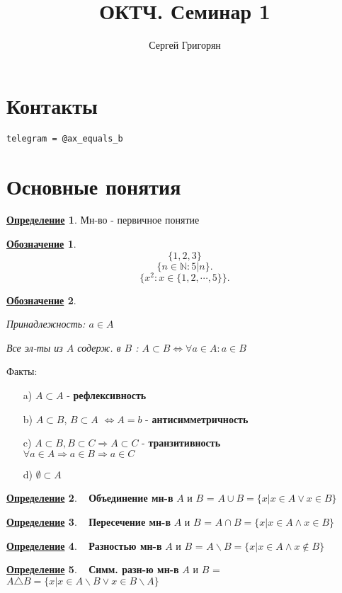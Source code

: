 \documentclass[a4, 12pt]{article}
\title{ОКТЧ. Семинар 1}
\author{Сергей Григорян}
\newcommand{\N}{\mathbb{N}}
\newtheorem*{symb}{\underline{Обозначение}}
\theoremstyle{definition}
\newtheorem{definition}{\underline{Определение}}[section]
\begin{document}
\maketitle
\newpage
\section{Контакты}
\begin{verbatim}
telegram = @ax_equals_b
\end{verbatim}

\section{Основные понятия}
\begin{definition}
Мн-во - первичное понятие
\end{definition}

\begin{symb}
    \[
        \{1, 2, 3\}
    \]
    \[
    \{n \in \N \colon 5 | n\}
    .\] 
    \[
    \{x^2 \colon x \in \{1, 2, \cdots, 5\}\}
    .\] 
\end{symb}

\begin{symb}
~\newline

Принадлежность: $a \in A$ 

Все эл-ты из $A$ содерж. в $B$ : $A \subset B \iff \forall a \in A \colon a \in B$

\end{symb}

Факты:
\begin{itemize}
    \item[a) ] $A \subset A$ - \textbf{рефлексивность} 
    \item[b) ] $A \subset B$, $B \subset A$ $\iff A = b$ - \textbf{антисимметричность}
    \item[c) ] $A \subset B, B \subset C \Rightarrow A \subset C$ - \textbf{транзитивность}\\
        $\forall a \in A \Rightarrow a \in B \Rightarrow a \in C$
    \item[d) ] $\emptyset \subset A$ 
\end{itemize}

\begin{definition}
~\newline
\textbf{Объединение мн-в}  $A$ и $B$ = $A \cup B = \{x | x \in A \lor  x \in B\}$
\end{definition}
\begin{definition}
~\newline
\textbf{Пересечение мн-в} $A$ и $B$ = $A \cap B = \{x | x \in A \land x \in B\}$
\end{definition}
\begin{definition}
~\newline
\textbf{Разностью мн-в} $A$ и $B$ = $A \backslash B =  \{x | x \in A \land x \not\in B\}$
\end{definition}
\begin{definition}
~\newline
\textbf{Симм. разн-ю мн-в} $A$ и $B$ = $A \triangle B = \{x | x \in A \backslash B \lor x \in B \backslash A\}$
\end{definition}
\end{document}
